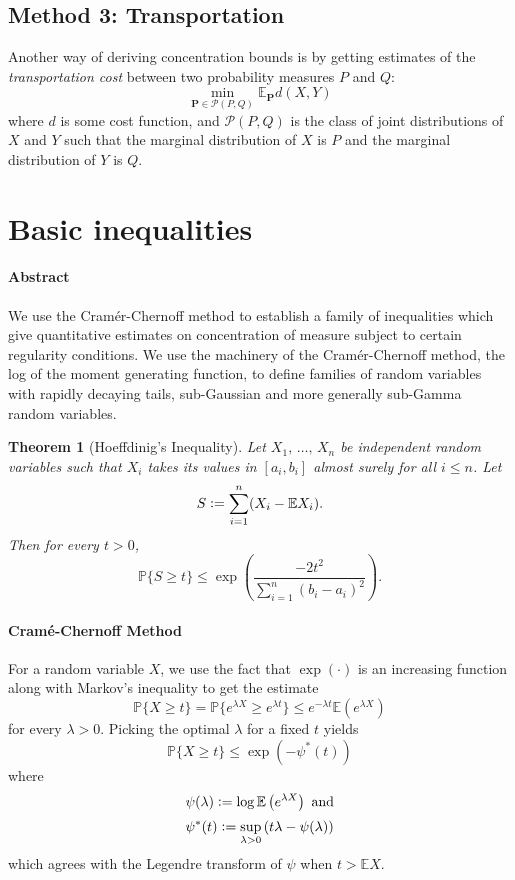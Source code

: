 \documentclass[reqno]{amsproc}
\newtheorem{theorem}{Theorem}
\newcommand{\defeq}{\vcentcolon=} %
\renewcommand{\P}{\mathbb{P}} %
\newcommand{\E}{\mathbb{E}} %
\begin{document}
\subsection*{Method 3: Transportation}
\label{sec:transport_method}
	Another way of deriving concentration bounds is by getting estimates of the \textit{transportation cost} between two probability measures $P$ and $Q$:
	\[
		\min_{\mathbf{P}\in\mathcal{P}(P,Q)} \E_\mathbf{P}d(X,Y)
	\]
	where $d$ is some cost function, and $\mathcal{P}(P,Q)$ is the class of joint distributions of $X$ and $Y$ such that the marginal distribution of $X$ is $P$ and the marginal distribution of $Y$ is $Q$.


\section{Basic inequalities}
\label{sec:basic_inequalites}
\paragraph{\textbf{Abstract}}
	We use the Cram\'{e}r-Chernoff method to establish a family of inequalities which give quantitative estimates on concentration of measure subject to certain regularity conditions. We use the machinery of the Cram\'{e}r-Chernoff method, the log of the moment generating function, to define families of random variables with rapidly decaying tails, sub-Gaussian and more generally sub-Gamma random variables.

\begin{theorem}[Hoeffdinig's Inequality]
\label{thm:hoeffding}
	Let $X_1,\, \dots,\, X_n$ be independent random variables such that $X_i$ takes its values in $[a_i, b_i]$ almost surely for all $i \leq n$. Let
	\[S \defeq \sum_{i=1}^n (X_i - \E X_i).\]
	Then for every $t > 0$,
	\[\P \{S \geq t \} \leq  \exp \left( \frac{-2t^2}{\sum_{i=1}^n (b_i-a_i)^2} \right).\]
\end{theorem}

\paragraph{\textbf{Cram\'{e}-Chernoff Method}}
\label{rmk:cramer_chernoff}
	For a random variable $X$, we use the fact that $\exp(\cdot)$ is an increasing function along with Markov's inequality to get the estimate
	\[\P \{X \geq t \} = \P \{e^{\lambda X} \geq e^{\lambda t} \} \leq e^{-\lambda t} \E \left( e^{\lambda X} \right)\]
	for every $\lambda > 0$.
	Picking the optimal $\lambda$ for a fixed $t$ yields
	\[\P \{X \geq t \} \leq \exp \left( -\psi^*(t) \right) \]
	where 
	\[\psi(\lambda) \defeq \log \E \left( e^{\lambda X} \right) \text{ and}\]
	\[\psi^*(t) \defeq \sup_{\lambda > 0} \left( t \lambda - \psi(\lambda) \right) \]
	which agrees with the Legendre transform of $\psi$ when $t > \E X$.
\end{document}
